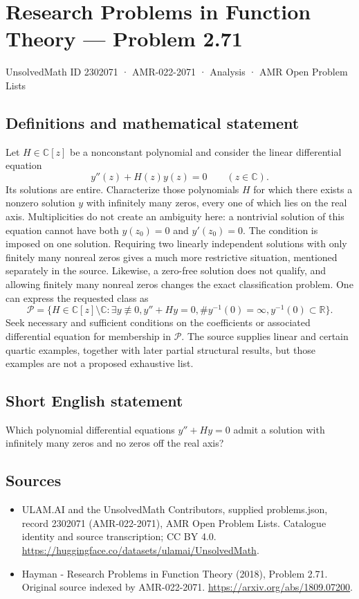 \documentclass[11pt,a4paper]{article}
\begin{document}
\section*{Research Problems in Function Theory — Problem 2.71}\label{2302071}
{\small UnsolvedMath ID 2302071 · AMR-022-2071 · Analysis · AMR Open Problem Lists}
\subsection{Definitions and mathematical statement}
Let $H\in\mathbb C[z]$ be a nonconstant polynomial and consider the linear differential equation
\[
y''(z)+H(z)y(z)=0\qquad(z\in\mathbb C).
\]
Its solutions are entire. Characterize those polynomials $H$ for which there exists a nonzero solution $y$ with infinitely many zeros, every one of which lies on the real axis. Multiplicities do not create an ambiguity here: a nontrivial solution of this equation cannot have both $y(z_0)=0$ and $y'(z_0)=0$.
The condition is imposed on one solution. Requiring two linearly independent solutions with only finitely many nonreal zeros gives a much more restrictive situation, mentioned separately in the source. Likewise, a zero-free solution does not qualify, and allowing finitely many nonreal zeros changes the exact classification problem.
One can express the requested class as
\[
\mathcal P=\{H\in\mathbb C[z]\setminus\mathbb C:
\exists y\not\equiv0, y''+Hy=0,
\#y^{-1}(0)=\infty, y^{-1}(0)\subset\mathbb R\}.
\]
Seek necessary and sufficient conditions on the coefficients or associated differential equation for membership in $\mathcal P$. The source supplies linear and certain quartic examples, together with later partial structural results, but those examples are not a proposed exhaustive list.
\subsection{Short English statement}
Which polynomial differential equations $y''+Hy=0$ admit a solution with infinitely many zeros and no zeros off the real axis?
\subsection{Sources}
\begin{itemize}
\item[S1] ULAM.AI and the UnsolvedMath Contributors, supplied problems.json, record 2302071 (AMR-022-2071), AMR Open Problem Lists. Catalogue identity and source transcription; CC BY 4.0.
\url{https://huggingface.co/datasets/ulamai/UnsolvedMath}.
\item[S2] Hayman - Research Problems in Function Theory (2018), Problem 2.71. Original source indexed by AMR-022-2071.
\url{https://arxiv.org/abs/1809.07200}.
\end{itemize}
\end{document}
